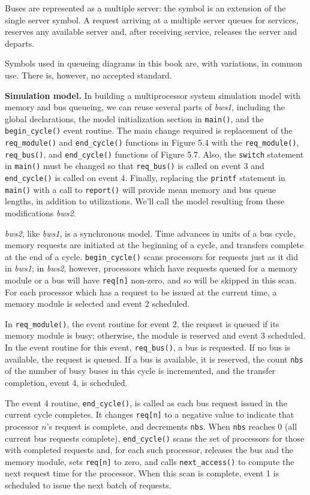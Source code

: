 Buses are represented as a multiple server: the symbol is an extension of
the single server symbol. A request arriving at a multiple server queues for
services, reserves any available server and, after receiving service, releases
the server and departs.

Symbols used in queueing diagrams in this book are, with variations, in
common use. There is, however, no accepted standard.

\noindent\textbf{Simulation model.} In building a multiprocessor system simulation model
with memory and bus queueing, we can reuse several parts of \emph{bws1}, including
the global declarations, the model initialization section in \texttt{main()}, and the
\texttt{begin\_cycle()} event routine. The main change required is replacement of
the \texttt{req\_module()} and \texttt{end\_cycle()} functions in Figure 5.4 with the
\texttt{req\_module()}, \texttt{req\_bus()}, and \texttt{end\_cycle()} functions of Figure 5.7.
Also, the \texttt{switch} statement in \texttt{main()} must be changed so that \texttt{req\_bus()}
is called on event 3 and \texttt{end\_cycle()} is called on event 4. Finally,
replacing the \texttt{printf} statement in \texttt{main()} with a call to \texttt{report()} will
provide mean memory and bus queue lengths, in addition to utilizations.
We'll call the model resulting from these modifications \emph{bws2}.

\emph{bws2}, like \emph{bws1}, is a synchronous model. Time advances in units of a bus
cycle, memory requests are initiated at the beginning of a cycle, and transfers
complete at the end of a cycle. \texttt{begin\_cycle()} scans processors for requests
just as it did in \emph{bws1}; in \emph{bws2}, however, processors which have requests
queued for a memory module or a bus will have \texttt{req[n]} non-zero, and so will
be skipped in this scan. For each processor which has a request to be issued
at the current time, a memory module is selected and event 2 scheduled.

In \texttt{req\_module()}, the event routine for event 2, the request is queued if
its memory module is busy; otherwise, the module is reserved and event 3
scheduled. In the event routine for this event, \texttt{req\_bus()}, a bus is requested.
If no bus is available, the request is queued. If a bus is available, it is
reserved, the count \texttt{nbs} of the number of busy buses in this cycle is incremented,
and the transfer completion, event 4, is scheduled.

The event 4 routine, \texttt{end\_cycle()}, is called as each bus request issued in
the current cycle completes. It changes \texttt{req[n]} to a negative value to
indicate that processor $n$'s request is complete, and decrements \texttt{nbs}. When
\texttt{nbs} reaches 0 (all current bus requests complete), \texttt{end\_cycle()} scans the set
of processors for those with completed requests and, for each such processor,
releases the bus and the memory module, sets \texttt{req[n]} to zero, and calls
\texttt{next\_access()} to compute the next request time for the processor. When
this scan is complete, event 1 is scheduled to issue the next batch of requests.

